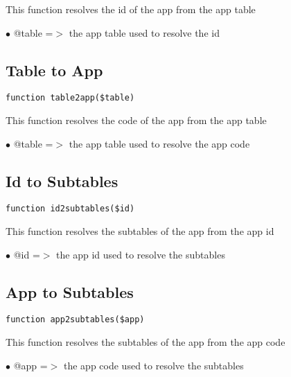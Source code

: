 \documentclass[a4paper]{book}
\begin{document}
This function resolves the id of the app from the app table

\begin{compactitem}
\item[\color{myblue}$\bullet$] @table =$>$ the app table used to resolve the id
\end{compactitem}

\hypertarget{toc28}{}
\subsection{Table to App}

\begin{lstlisting}
function table2app($table)
\end{lstlisting}

This function resolves the code of the app from the app table

\begin{compactitem}
\item[\color{myblue}$\bullet$] @table =$>$ the app table used to resolve the app code
\end{compactitem}

\hypertarget{toc29}{}
\subsection{Id to Subtables}

\begin{lstlisting}
function id2subtables($id)
\end{lstlisting}

This function resolves the subtables of the app from the app id

\begin{compactitem}
\item[\color{myblue}$\bullet$] @id =$>$ the app id used to resolve the subtables
\end{compactitem}

\hypertarget{toc30}{}
\subsection{App to Subtables}

\begin{lstlisting}
function app2subtables($app)
\end{lstlisting}

This function resolves the subtables of the app from the app code

\begin{compactitem}
\item[\color{myblue}$\bullet$] @app =$>$ the app code used to resolve the subtables
\end{compactitem}
\end{document}
